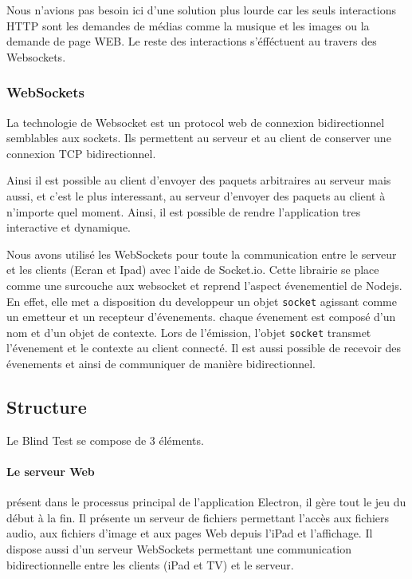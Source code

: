 Nous n'avions pas besoin ici d'une solution plus lourde car les seuls interactions HTTP sont les demandes de médias comme la musique et les images ou la demande de page WEB.
Le reste des interactions s'éfféctuent au travers des Websockets.

\subsubsection{WebSockets}

La technologie de Websocket est un protocol web de connexion bidirectionnel semblables aux sockets.
Ils permettent au serveur et au client de conserver une connexion TCP bidirectionnel.

Ainsi il est possible au client d'envoyer des paquets arbitraires au serveur mais aussi, et c'est le plus interessant, au serveur d'envoyer des paquets au client à n'importe quel moment.
Ainsi, il est possible de rendre l'application tres interactive et dynamique.

Nous avons utilisé les WebSockets pour toute la communication entre le serveur et les clients (Ecran et Ipad) avec l'aide de Socket.io.
Cette librairie se place comme une surcouche aux websocket et reprend l'aspect évenementiel de Nodejs.
En effet, elle met a disposition du developpeur un objet \texttt{socket} agissant comme un emetteur et un recepteur d'évenements.
chaque évenement est composé d'un nom et d'un objet de contexte.
Lors de l'émission, l'objet \texttt{socket} transmet l'évenement et le contexte au client connecté.
Il est aussi possible de recevoir des évenements et ainsi de communiquer de manière bidirectionnel.

\subsection{Structure}

Le Blind Test se compose de 3 éléments.

\paragraph{Le serveur Web} présent dans le processus principal de l'application Electron, il gère tout le jeu du début à la fin.
Il présente un serveur de fichiers permettant l'accès aux fichiers audio, aux fichiers d'image et aux pages Web depuis l'iPad et l'affichage.
Il dispose aussi d'un serveur WebSockets permettant une communication bidirectionnelle entre les clients (iPad et TV) et le serveur.

